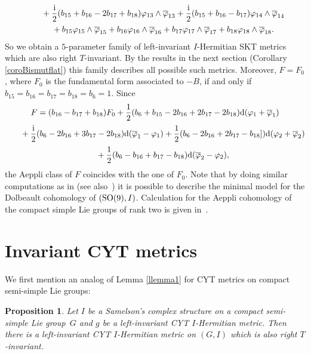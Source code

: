 \documentclass[10pt,a4paper]{amsart}
\numberwithin{equation}{section}
\newtheorem{Proposition}[Theorem]{Proposition}
 { \theoremstyle{definition}
\newtheorem{Definition}[Theorem]{Definition}
\newtheorem{Note}[Theorem]{Note}
\newtheorem{Example}[Theorem]{Example}
\newtheorem{Remark}[Theorem]{Remark} }
\begin{document}
\begin{Example}
\begin{gather*}
\hphantom{F = }{} + \frac{{\rm i}}{2} ( b_{15} + b_{16} -2 b_{17} +b_{18}) \varphi_{13} \wedge \overline \varphi_{13} + \frac{{\rm i}}{2} (b_{15} + b_{16} - b_{17}) \varphi_{14} \wedge \overline \varphi_{14}\\
\hphantom{F = }{} + b_{15} \varphi_{15} \wedge \overline \varphi_{15}+ b_{16} \varphi_{16} \wedge \overline \varphi_{16}+ b_{17} \varphi_{17} \wedge \overline \varphi_{17}+ b_{18} \varphi_{18} \wedge \overline \varphi_{18}.
\end{gather*}
So we obtain a $5$-parameter family of left-invariant $I$-Hermitian SKT metrics which are also right $T$-invariant. By the results in the next section (Corollary \ref{coroBismutflat}) this family describes all possible such metrics.
Moreover, $F = F_0$, where $F_0$ is the fundamental form associated to $- B$, if and only if $b_{15}= b_{16}= b_{17}= b_{18} = b_6 =1$. Since
\begin{gather*}
F = (b_{16} - b_{17} + b_{18}) F_0 + \frac{1}{2} (b_6 + b_{15} -2 b_{16} + 2 b_{17} -2 b_{18}) {\rm d} (\varphi_1 + \overline \varphi_1)\\[2pt]
\hphantom{F=}{} + \frac{{\rm i}}{2} (b_6 - 2b_{16} + 3 b_{17} - 2 b_{18}) {\rm d} (\overline \varphi_1 - \varphi_1)
+ \frac 12 (b_6 -2 b_{16} + 2 b_{17} - b_{18}]) {\rm d} ( \varphi_2 +\overline \varphi_2)\\[2pt]
\hphantom{F=}{} + \frac{1}{2} (b_6 - b_{16} + b_{17} - b_{18}) {\rm d} (\overline \varphi_2 - \varphi_2),
\end{gather*}
 the Aeppli class of $F$ coincides with the one of $F_0$. Note that by doing similar computations as in \cite{Pittie,Pittie2} (see also~\cite{LUV}) it is possible to describe the minimal model for the Dolbeault cohomology of $({\rm SO}(9), I)$. Calculation for the Aeppli cohomology of the compact simple Lie groups of rank two is given in~\cite{Barbaro}.
\end{Example}


\section{ Invariant CYT metrics}

We first mention an analog of Lemma \ref{llemma1} for CYT metrics on compact semi-simple Lie groups:

\begin{Proposition}
Let $I$ be a Samelson's complex structure on a compact semi-simple Lie group~$G$ and $g$ be a left-invariant CYT $I$-Hermitian metric. Then there is a left-invariant CYT $I$-Hermitian metric on $(G,I)$ which is also right $T$-invariant.
\end{Proposition}
\end{document}
